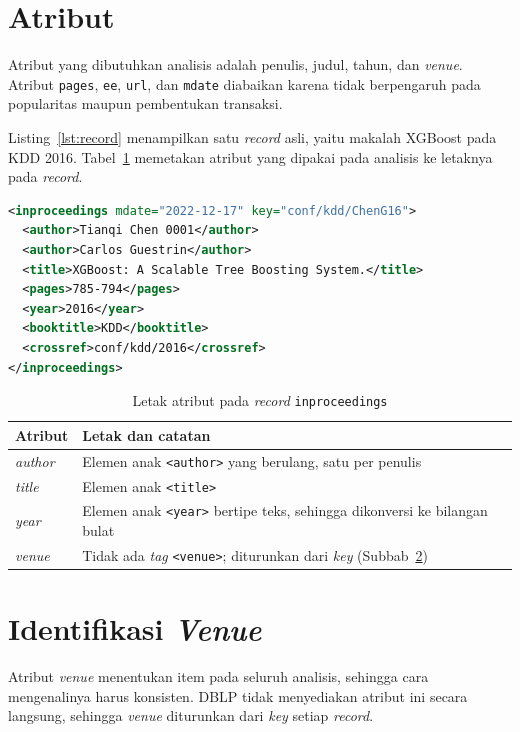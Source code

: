 \section{Atribut}
\label{sec:anatomi}
Atribut yang dibutuhkan analisis adalah penulis, judul, tahun, dan \textit{venue}. Atribut \texttt{pages}, \texttt{ee}, \texttt{url}, dan \texttt{mdate} diabaikan karena tidak berpengaruh pada popularitas maupun pembentukan transaksi.

Listing~\ref{lst:record} menampilkan satu \textit{record} asli, yaitu makalah XGBoost pada KDD 2016. Tabel~\ref{tab:pemetaan} memetakan atribut yang dipakai pada analisis ke letaknya pada \textit{record}.

\begin{lstlisting}[caption={Satu \textit{record} \texttt{inproceedings} pada \textit{dump} DBLP},label={lst:record},language=XML,basicstyle=\ttfamily\footnotesize,breaklines=true]
<inproceedings mdate="2022-12-17" key="conf/kdd/ChenG16">
  <author>Tianqi Chen 0001</author>
  <author>Carlos Guestrin</author>
  <title>XGBoost: A Scalable Tree Boosting System.</title>
  <pages>785-794</pages>
  <year>2016</year>
  <booktitle>KDD</booktitle>
  <crossref>conf/kdd/2016</crossref>
</inproceedings>
\end{lstlisting}

\begin{table}[!htb]
\caption{Letak atribut pada \textit{record} \texttt{inproceedings}}
\label{tab:pemetaan}
\small
\begin{tabularx}{\textwidth}{@{}lX@{}}
\toprule
\textbf{Atribut} & \textbf{Letak dan catatan} \\
\midrule
\textit{author} & Elemen anak \texttt{<author>} yang berulang, satu per penulis \\
\textit{title} & Elemen anak \texttt{<title>} \\
\textit{year} & Elemen anak \texttt{<year>} bertipe teks, sehingga dikonversi ke bilangan bulat \\
\textit{venue} & Tidak ada \textit{tag} \texttt{<venue>}; diturunkan dari \textit{key} (Subbab~\ref{sec:key}) \\
\bottomrule
\end{tabularx}
\end{table}

\section{Identifikasi \textit{Venue}}
\label{sec:key}
Atribut \textit{venue} menentukan item pada seluruh analisis, sehingga cara mengenalinya harus konsisten. DBLP tidak menyediakan atribut ini secara langsung, sehingga \textit{venue} diturunkan dari \textit{key} setiap \textit{record}.

